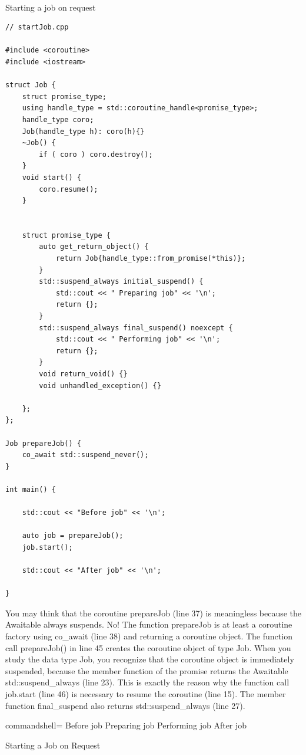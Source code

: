 \hspace*{\fill} \\ %
\noindent
Starting a job on request
\begin{lstlisting}[style=styleCXX]
// startJob.cpp

#include <coroutine>
#include <iostream>

struct Job {
	struct promise_type;
	using handle_type = std::coroutine_handle<promise_type>;
	handle_type coro;
	Job(handle_type h): coro(h){}
	~Job() {
		if ( coro ) coro.destroy();
	}
	void start() {
		coro.resume();
	}


	struct promise_type {
		auto get_return_object() {
			return Job{handle_type::from_promise(*this)};
		}
		std::suspend_always initial_suspend() {
			std::cout << " Preparing job" << '\n';
			return {};
		}
		std::suspend_always final_suspend() noexcept {
			std::cout << " Performing job" << '\n';
			return {};
		}
		void return_void() {}
		void unhandled_exception() {}
	
	};
};

Job prepareJob() {
	co_await std::suspend_never();
}

int main() {

	std::cout << "Before job" << '\n';
	
	auto job = prepareJob();
	job.start();
	
	std::cout << "After job" << '\n';

}
\end{lstlisting}

You may think that the coroutine prepareJob (line 37) is meaningless because the Awaitable always suspends. No! The function prepareJob is at least a coroutine factory using co\_await (line 38) and returning a coroutine object. The function call prepareJob() in line 45 creates the coroutine object of type Job. When you study the data type Job, you recognize that the coroutine object is immediately suspended, because the member function of the promise returns the Awaitable std::suspend\_always (line 23). This is exactly the reason why the function call job.start (line 46) is necessary to resume the coroutine (line 15). The member function final\_suspend also returns std::suspend\_always (line 27).

\begin{tcblisting}{commandshell={}}
Before job
    Preparing job
    Performing job
After job
\end{tcblisting}

\begin{center}
Starting a Job on Request
\end{center}

